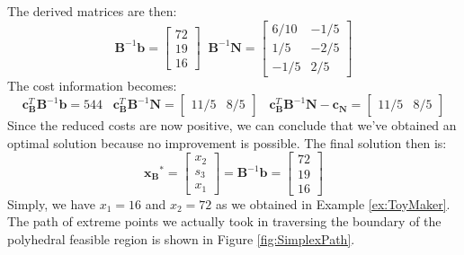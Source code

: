 \begin{example}
The derived matrices are then:
\begin{displaymath}
\mathbf{B}^{-1}\mathbf{b} = \begin{bmatrix}72\\19\\16\end{bmatrix}\;\;
\mathbf{B}^{-1}\mathbf{N} = \begin{bmatrix}
6/10 & -1/5\\
1/5 & -2/5\\
-1/5 & 2/5
\end{bmatrix}
\end{displaymath}
The cost information becomes:
\begin{displaymath}
\mathbf{c}_\mathbf{B}^T\mathbf{B}^{-1}\mathbf{b} = 544 \;\;\;
\mathbf{c}_\mathbf{B}^T\mathbf{B}^{-1}\mathbf{N} = \begin{bmatrix}11/5 & 8/5\end{bmatrix}\;\;\;
\mathbf{c}_\mathbf{B}^T\mathbf{B}^{-1}\mathbf{N} - \mathbf{c_N} = 
\begin{bmatrix}11/5 & 8/5\end{bmatrix}
\end{displaymath}
Since the reduced costs are now positive, we can conclude that we've obtained an optimal solution because no improvement is possible. The final solution then is:
\begin{displaymath}
\mathbf{x_B}^* = \begin{bmatrix}
x_2\\
s_3\\
x_1
\end{bmatrix} = \mathbf{B}^{-1}\mathbf{b} = 
\begin{bmatrix}
72\\
19\\
16
\end{bmatrix}
\end{displaymath}
Simply, we have $x_1 = 16$ and $x_2 = 72$ as we obtained in Example \ref{ex:ToyMaker}. The path of extreme points we actually took in traversing the boundary of the polyhedral feasible region is shown in Figure \ref{fig:SimplexPath}.
\begin{figure}[htbp]
\centering

\end{figure}
\end{example}
